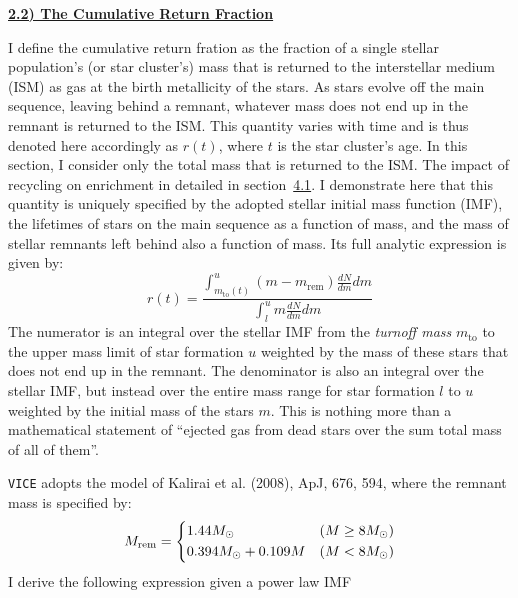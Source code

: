 \documentclass{report}
\newcommand\ddfrac[2]{\frac{\displaystyle #1}{\displaystyle #2}}
\begin{document}
\newpage
\noindent
\begin{center}
\hypertarget{ssp:crf}{
	\underline{\LARGE
		\textbf{2.2) The Cumulative Return Fraction}
	}
}
\end{center}
\par\noindent 
I define the cumulative return fration as the fraction of a single stellar 
population's (or star cluster's) mass that is returned to the interstellar 
medium (ISM) as gas at the birth metallicity of the stars. As stars evolve off 
the main sequence, leaving behind a remnant, whatever mass does not end up in 
the remnant is returned to the ISM. This quantity varies with time and is thus 
denoted here accordingly as $r(t)$, where $t$ is the star cluster's age. In 
this section, I consider only the total mass that is returned to the ISM. The 
impact of recycling on enrichment in detailed in 
section~\hyperlink{enrichment:equation}{4.1}. I demonstrate here that this 
quantity is uniquely specified by the adopted stellar initial mass function 
(IMF), the lifetimes of stars on the main sequence as a function of mass, and 
the mass of stellar remnants left behind also a function of mass. Its full 
analytic expression is given by: 
\begin{equation}
r(t) = \ddfrac{
	\int_{m_\text{to}(t)}^u (m - m_\text{rem})\frac{dN}{dm}dm
}{
	\int_l^u m\frac{dN}{dm}dm
}
\end{equation}
The numerator is an integral over the stellar IMF from the \textit{turnoff 
mass} $m_\text{to}$ to the upper mass limit of star formation $u$ weighted by 
the mass of these stars that does not end up in the remnant. The denominator 
is also an integral over the stellar IMF, but instead over the entire mass 
range for star formation $l$ to $u$ weighted by the initial mass of the stars 
$m$. This is nothing more than a mathematical statement of ``ejected gas from 
dead stars over the sum total mass of all of them''. 
\par
\texttt{VICE} adopts the model of Kalirai et al. (2008), ApJ, 676, 594, where 
the remnant mass is specified by: 
\begin{equation}
M_\text{rem} = 
\begin{dcases}
1.44 M_\odot & (M \geq 8 M_\odot) \\ 
0.394 M_\odot + 0.109 M & (M < 8 M_\odot)
\end{dcases}
\end{equation}
I derive the following expression given a power law IMF 
\end{document}

